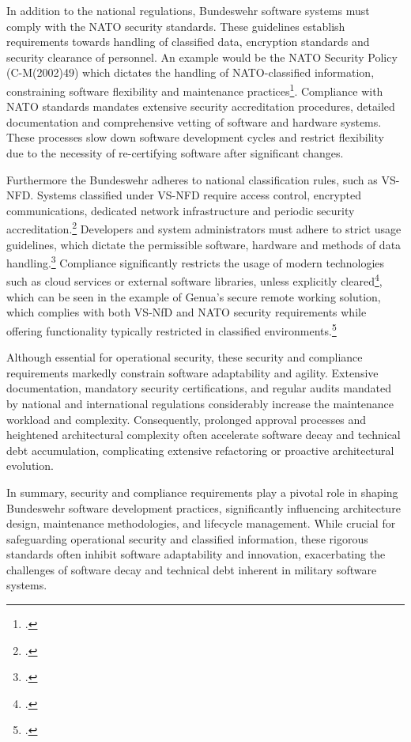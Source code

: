 In addition to the national regulations, Bundeswehr software systems must comply with the NATO security standards. These guidelines establish requirements towards handling of classified data, encryption standards and security clearance of personnel.
An example would be the NATO Security Policy (C-M(2002)49) which dictates the handling of NATO-classified information, constraining software flexibility and maintenance practices\footcite[Enclosure B, pp. 1–3; Enclosure F, pp. 1–2]{NATO2002SecurityPolicy}. 
Compliance with NATO standards mandates extensive security accreditation procedures, detailed documentation and comprehensive vetting of software and hardware systems.
These processes slow down software development cycles and restrict flexibility due to the necessity of re-certifying software after significant changes.

Furthermore the Bundeswehr adheres to national classification rules, such as \ac{VS-NFD}. Systems classified under \ac{VS-NFD} require access control, encrypted communications, dedicated network infrastructure and periodic security accreditation.\footcite[see Part 2, pp. 1–3; Part 3, pp. 1–6]{BMI2010VSNFD}
Developers and system administrators must adhere to strict usage guidelines, which dictate the permissible software, hardware and methods of data handling.\footcite[Part 3, No. 3.1–3.7, pp. 1–5]{BMI2010VSNFD} Compliance significantly restricts the usage of modern technologies such as cloud services or external software libraries, unless explicitly cleared\footcite[Part 3, No. 3.4.1–3.4.5, pp. 4–5]{BMI2010VSNFD}, 
which can be seen in the example of Genua’s secure remote working solution, which complies with both VS-NfD and NATO security requirements while offering functionality typically restricted in classified environments.\footcite{Genua2023VSNFD}

Although essential for operational security, these security and compliance requirements markedly constrain software adaptability and agility. 
Extensive documentation, mandatory security certifications, and regular audits mandated by national and international regulations considerably increase the maintenance workload and complexity. 
Consequently, prolonged approval processes and heightened architectural complexity often accelerate software decay and technical debt accumulation, complicating extensive refactoring or proactive architectural evolution.

In summary, security and compliance requirements play a pivotal role in shaping Bundeswehr software development practices, significantly influencing architecture design, 
maintenance methodologies, and lifecycle management. While crucial for safeguarding operational security and classified information, these rigorous standards often inhibit software adaptability and innovation, exacerbating the challenges of software decay and technical debt inherent in military software systems.

